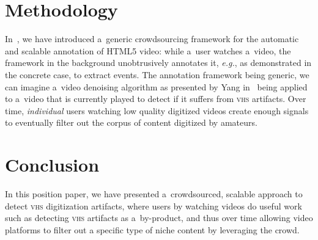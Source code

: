 \documentclass[runningheads,a4paper]{llncs}
\begin{document}
\section{Methodology}

In~\cite{steiner2011crowdsourcing}, we have introduced
a~generic crowdsourcing framework for the automatic and scalable
annotation of HTML5 video:
while a~user watches a~video, the framework in the background
unobtrusively annotates it, \emph{e.g.}, as demonstrated
in the concrete case, to extract events.
The annotation framework being generic,
we can imagine a~video denoising algorithm
as presented by Yang in~\cite{yang2009videonoise}
being applied to a~video that is currently played
to detect if it suffers from {\scshape vhs} artifacts.
Over time, \emph{individual} users watching low quality digitized videos
create enough signals to eventually filter out the corpus of 
content digitized by amateurs.

\vspace{-0.5em}

\section{Conclusion}

In this position paper, we have presented a~crowdsourced,
scalable approach to detect {\scshape vhs} digitization artifacts,
where users by watching videos do useful work such as 
detecting {\scshape vhs} artifacts as a~by-product,
and thus over time allowing video platforms to filter out
a specific type of niche content by leveraging the crowd.

\vspace{-0.5em}

\footnotesize


\end{document}
